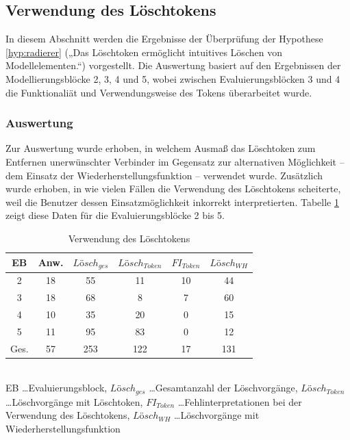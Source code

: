 
\subsection{Verwendung des Löschtokens} %
\label{sub:verwendung_des_löschtokens}

In diesem Abschnitt werden die Ergebnisse der Überprüfung der Hypothese \ref{hyp:radierer} („Das Löschtoken ermöglicht intuitives Löschen von Modellelementen.“) vorgestellt. Die Auswertung basiert auf den Ergebnissen der Modellierungsblöcke 2, 3, 4 und 5, wobei zwischen Evaluierungsblöcken 3 und 4 die Funktionaliät und Verwendungsweise des Tokens überarbeitet wurde.

\subsubsection{Auswertung} %

Zur Auswertung wurde erhoben, in welchem Ausmaß das Löschtoken zum Entfernen unerwünschter Verbinder im Gegensatz zur alternativen Möglichkeit -- dem Einsatz der Wiederherstellungsfunktion -- verwendet wurde. Zusätzlich wurde erhoben, in wie vielen Fällen die Verwendung des Löschtokens scheiterte, weil die Benutzer dessen Einsatzmöglichkeit inkorrekt interpretierten. Tabelle \ref{tab:fehlinterpretationen} zeigt diese Daten für die Evaluierungsblöcke 2 bis 5.

\begin{table}[htbp]
	\centering
	\caption{Verwendung des Löschtokens}
\begin{tabular}{| c || c || c | c | c | c |}
  \hline
   EB    & Anw. & $Lösch_{ges}$ & $Lösch_{Token}$ & $FI_{Token}$ & $Lösch_{WH}$ \\ \hline
   2     & 18 & 55 & 11 & 10 & 44 \\ 
   3     & 18 & 68 &  8 &  7 & 60 \\ 
   4     & 10 & 35 & 20 &  0 & 15 \\ 
   5     & 11 & 95 & 83 &  0 & 12 \\ \hline
   Ges.  & 57 & 253 & 122 & 17 & 131 \\ \hline
\end{tabular} \\
\footnotesize EB \ldots Evaluierungsblock, $Lösch_{ges}$ \ldots Gesamtanzahl der Löschvorgänge, $Lösch_{Token}$ \ldots Löschvorgänge mit Löschtoken, $FI_{Token}$ \ldots Fehlinterpretationen bei der Verwendung des Löschtokens, $Lösch_{WH}$ \ldots Löschvorgänge mit Wiederherstellungsfunktion
	\label{tab:fehlinterpretationen}
\end{table}

